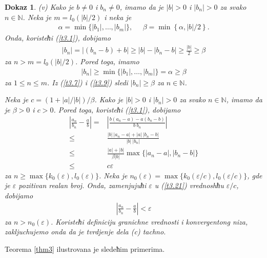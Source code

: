 \documentclass[11pt,a4paper]{article}
\newtheorem*{dokaz}{Dokaz}
\begin{document}
\begin{dokaz}
(v) Kako je $b\neq 0$ i $b_n\neq 0$, imamo 
da je $|b|>0$ i $|b_n|>0$ za svako $n\in\mathbb{N}$.
Neka je $m=l_0(|b|/2)$ i neka je 
\begin{align*}
    \alpha=\min\{|b_1|,\dots,|b_m|\}, 
    \;\;\;\;\; 
    \beta=\min\left\{\alpha,|b|/2\right\}. 
\end{align*}
Onda, koristeћi (\ref{t3.1}), dobijamo 
\begin{align}\label{t3.7}
    |b_n|=|(b_n-b)+b|
    \geq 
    |b|-|b_n-b|
    \geq 
    \frac{|b|}{2}
    \geq 
    \beta
\end{align}
za $n>m=l_0(|b|/2)$. 
Pored toga, imamo  
\begin{align}\label{t3.9}
    |b_n|
    \geq 
    \min\{|b_1|,\dots,|b_m|\}
    =
    \alpha
    \geq \beta
\end{align}
za $1\leq n\leq m$. 
Iz (\ref{t3.7}) i (\ref{t3.9}) sledi 
$|b_n|\geq\beta$ za $n\in\mathbb{N}$. 

Neka je $c=(1+|a|/|b|)/\beta$. 
Kako je $|b|>0$ i $|b_n|>0$ za svako $n\in\mathbb{N}$, 
imamo da je $\beta>0$ i $c>0$.  
Pored toga, koristeћi (\ref{t3.1}), dobijamo  
\begin{align}\label{t3.21}
    \left|\frac{a_n}{b_n} - \frac{a}{b}\right|
    =&
    \left|\frac{b(a_n-a)-a(b_n-b)}{b\:b_n} \right|
    \nonumber\\
    \leq &
    \frac{|b|\: |a_n-a| + |a|\: |b_n-b|}{|b|\: |b_n|}
    \nonumber\\
    \leq &
   \frac{|a|+|b|}{\beta |b|}
    \max\{|a_n-a|,|b_n-b| \}
    \nonumber\\
    \leq &
    c\varepsilon
\end{align}
za $n\geq\max\{k_{0}(\varepsilon),l_{0}(\varepsilon)\}$. 
Neka je 
$n_{0}(\varepsilon)=\max\{k_{0}(\varepsilon/c),
l_{0}(\varepsilon/c)\}$, gde je $\varepsilon$ 
pozitivan realan broj. 
Onda, zamenjujuћi $\varepsilon$ u (\ref{t3.21})  
vrednoshћu $\varepsilon/c$, dobijamo 
\begin{align*}
    \left|\frac{a_n}{b_n} - \frac{a}{b}\right|<\varepsilon
\end{align*}
za $n>n_{0}(\varepsilon)$. 
Koristeћi definiciju granichne vrednosti i konvergentong niza, 
zakljuchujemo onda da je tvrdjenje dela (c) tachno. 
\end{dokaz}

Teorema \ref{thm3} ilustrovana je sledeћim primerima. 
\end{document}
